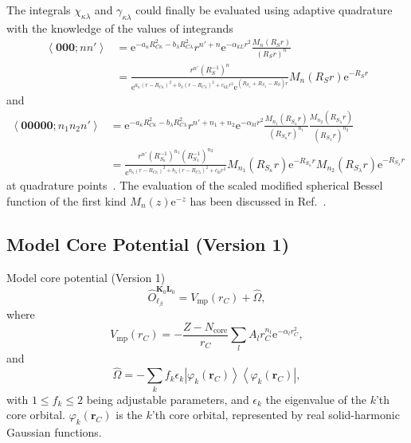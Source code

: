 \documentclass[a4paper,11pt,twoside,openright]{book}
\begin{document}
The integrals $\chi_{\kappa\lambda}$ and $\gamma_{\kappa\lambda}$ could finally be evaluated
using adaptive quadrature with the knowledge of the values of integrands
\begin{align}
  \left\langle\boldsymbol{000};nn'\right\rangle
  &=\mathrm{e}^{-a_{\kappa}R_{C\kappa}^{2}-b_{\lambda}R_{C\lambda}^{2}}%
    r^{n'+n}\mathrm{e}^{-\alpha_{kL}r^2}\frac{M_{n}(R_{S}r)}{(R_{S}r)^{n}}\\
  &=\frac{r^{n'}\left(R_{S}^{-1}\right)^{n}}%
    {\mathrm{e}^{a_{\kappa}(r-R_{C\kappa})^2+b_{\lambda}(r-R_{C\lambda})^2+c_{kL}r^2}%
      \mathrm{e}^{(R_{S_{\kappa}}+R_{S_{\lambda}}-R_{S})r}}%
    M_{n}(R_{S}r)\mathrm{e}^{-R_{S}r}\nonumber
\end{align}
and
\begin{align}
  \left\langle\boldsymbol{00000};n_{1}n_{2}n'\right\rangle
  &=\mathrm{e}^{-a_{\kappa}R_{C\kappa}^{2}-b_{\lambda}R_{C\lambda}^{2}}%
    r^{n'+n_1+n_2}\mathrm{e}^{-\alpha_{kl}r^2}%
    \frac{M_{n_1}(R_{S_{\kappa}}r)}{(R_{S_{\kappa}}r)^{n_1}}%
    \frac{M_{n_2}(R_{S_{\lambda}}r)}{(R_{S_{\lambda}}r)^{n_2}}\\
  &=\frac{r^{n'}\left(R_{S_{\kappa}}^{-1}\right)^{n_1}\left(R_{S_{\lambda}}^{-1}\right)^{n_2}}%
    {\mathrm{e}^{a_{\kappa}(r-R_{C\kappa})^2+b_{\lambda}(r-R_{C\lambda})^2+c_{kl}r^2}}%
    M_{n_1}(R_{S_{\kappa}}r)\mathrm{e}^{-R_{S_{\kappa}}r}%
    M_{n_2}(R_{S_{\lambda}}r)\mathrm{e}^{-R_{S_{\lambda}}r}\nonumber
\end{align}
at quadrature points~\cite{Flores-Moreno:JCC27:1009}. The evaluation of the scaled modified
spherical Bessel function of the first kind $M_{n}(z)\mathrm{e}^{-z}$ has been discussed
in Ref.~\cite{Flores-Moreno:JCC27:1009}.

\subsection{Model Core Potential (Version 1)}
\label{subsec:mcp1}

Model core potential (Version 1)
\begin{equation}
  \label{eq:mcp-op1}
  \hat{O}_{\ell_{\beta}}^{\boldsymbol{K}_{0}\boldsymbol{L}_{0}}
  =V_\text{mp}(r_C)+\hat{\Omega},
\end{equation}
where
\begin{equation}
  \label{eq:V-core}
  V_\text{mp}(r_C)=-\frac{Z-N_\text{core}}{r_C}\sum_{l}A_{l}r_{C}^{n_l}\mathrm{e}^{-\alpha_{l}r_{C}^{2}},
\end{equation}
and
\begin{equation}
  \label{eq:shift-op}
  \hat{\Omega}
  =-\sum_{k}f_k\epsilon_k\left|\varphi_k(\boldsymbol{r}_C)\right\rangle\left\langle\varphi_k(\boldsymbol{r}_C)\right|,
\end{equation}
with $1\le f_k\le 2$ being adjustable parameters, and $\epsilon_k$ the eigenvalue of the
$k$'th core orbital. $\varphi_k(\boldsymbol{r}_C)$ is the $k$'th core orbital,
represented by real solid-harmonic Gaussian functions.
\end{document}
